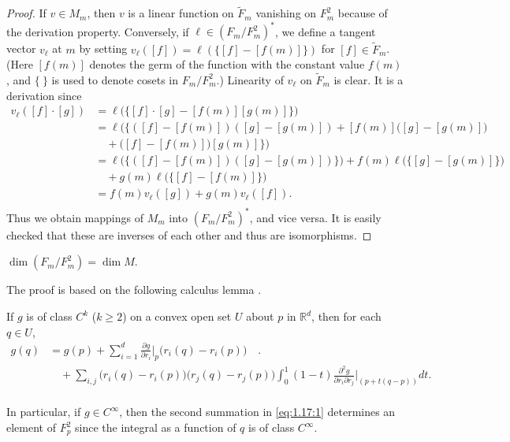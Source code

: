 \begin{proof}
	If $v \in M_m$, then $v$ is a linear function on $\widetilde{F}_m$
	vanishing on $F_m^2$ because of the derivation property.
	Conversely, if $\ell \in (F_m/F_m^2)^*$, we define a tangent
	vector $v_\ell$ at $m$ by setting
	$v_\ell([f]) = \ell(\{[f] - [f(m)]\})$
	for $[f] \in \widetilde{F}_m$. (Here $[f(m)]$
	denotes the germ of the function with the constant value $f(m)$,
	and $\{\ \}$ is used to denote cosets in $F_m/F_m^2$.)
	Linearity of $v_\ell$ on $\widetilde{F}_m$ is clear. It is a derivation since
	\[
		\begin{aligned}{v_{\ell}([f]\cdot[g])}&{{}=\ell\big(\{[f]\cdot[g]-[f(m)][g(m)]\}\big)}\\ {}&{{}=\ell\big(\{([f]-[f(m)])([g]-[g(m)])+[f(m)]\big([g]-[g(m)]\big)}\\ {}&{{}\quad+\big([f]-[f(m)]\big)[g(m)]\}\big)}\\ {}&{{}=\ell\big(\{([f]-[f(m)])([g]-[g(m)])\}\big)+f(m)\ell\big(\{[g]-[g(m)]\}\big)}\\ {}&{{}\quad+g(m)\ell\big(\{[f]-[f(m)]\}\big)}\\ {}&{{}=f(m)v_{\ell}([g])+g(m)v_{\ell}([f]).}\\ \end{aligned}
	\]
	Thus we obtain mappings of $M_{m}$ into $(F_{m}/F_{m}^{2})^{*}$,
	and vice versa. It is easily checked that these are inverses
	of each other and thus are isomorphisms.
\end{proof}

\begin{theorem}\label{thm:1.17}
	$\dim\left(F_{m}/F_{m}^{2}\right)=\dim M.$
\end{theorem}

The proof is based on the following calculus lemma \cite{31}.

\begin{lemma*}
	If $g$ is of class $C^k$ ($k \geq 2$) on a convex open set $U$ about $p$ in $\mathbb{R}^d$, then for each $q \in U$,
	\begin{equation}
		\label{eq:1.17:1}
		\begin{aligned}{g(q)} & {{}=g(p)+\sum_{i=1}^{d}\frac{\partial g}{\partial r_{i}}\bigg|_{p}\big(r_{i}(q)-r_{i}(p)\big)\quad.} \\
		               {}     & {{}\quad+\sum_{i,j}\big(r_{i}(q)-r_{i}(p)\big)\big(r_{j}(q)-r_{j}(p)\big)
			                        \int_{0}^{1}(1-t)\frac{\partial^{2}g}{\partial r_{i}\partial r_{j}}\bigg|_{(p+t(q-p))}d t.}         \\
		\end{aligned}
	\end{equation}
\end{lemma*}
In particular, if $g \in C^{\infty}$, then the second summation in \eqref{eq:1.17:1}
determines an element of $F_{p}^{2}$ since the integral as a function of $q$ is of class $C^{\infty}$.

